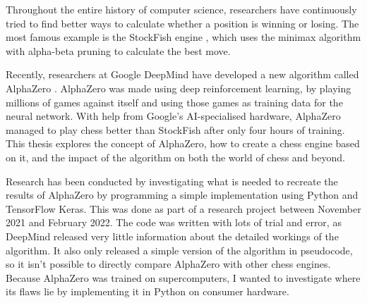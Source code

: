 \documentclass{article}
\begin{document}
Throughout the entire history of computer science, researchers have continuously tried to find better
ways to calculate whether a position is winning or losing. The most famous example is the StockFish 
engine \cite{StockfishChess2022}, which uses the minimax algorithm with alpha-beta pruning to calculate the best move.

Recently, researchers at Google DeepMind have developed a new algorithm called AlphaZero \cite{AlphaZero2022}.
AlphaZero was made using deep reinforcement learning, by playing millions of games against itself and 
using those games as training data for the neural network. With help from Google's AI-specialised hardware,
AlphaZero managed to play chess better than StockFish after only four hours of training.
This thesis explores the concept of AlphaZero, how to create a chess engine based on it, and the impact of 
the algorithm on both the world of chess and beyond.

Research has been conducted by investigating what is needed to recreate the results of AlphaZero
by programming a simple implementation using Python and TensorFlow Keras. This was done as part of a research project
between November 2021 and February 2022. The code was written with lots of trial and error, as DeepMind released 
very little information about the detailed workings of the algorithm. It also only released a simple version of 
the algorithm in pseudocode, so it isn't possible to directly compare AlphaZero with other chess engines.
Because AlphaZero was trained on supercomputers, I wanted to investigate where its flaws lie by 
implementing it in Python on consumer hardware.


\end{document}
